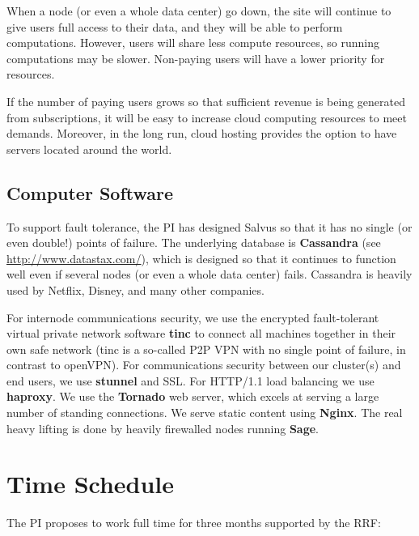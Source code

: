 \documentclass[11pt]{article}
\begin{document}
When a node (or even a whole data center) go down, the site will
continue to give users full access to their data, and they will be
able to perform computations.  However, users will share less compute
resources, so running computations may be slower.  Non-paying users
will have a lower priority for resources.

If the number of paying users grows so that sufficient revenue is
being generated from subscriptions, it will be easy to increase cloud
computing resources to meet demands.  Moreover, in the long run, cloud
hosting provides the option to have servers located around the world.

\subsection{Computer Software}

To support fault tolerance, the PI has designed Salvus so that it has
no single (or even double!) points of failure.  The underlying
database is {\bf Cassandra} (see \url{http://www.datastax.com/}),
which is designed so that it continues to function well even if
several nodes (or even a whole data center) fails.  Cassandra is
heavily used by Netflix, Disney, and many other companies.

For internode communications security, we use the encrypted
fault-tolerant virtual private network software {\bf tinc} to connect
all machines together in their own safe network (tinc is a so-called
P2P VPN with no single point of failure, in contrast to openVPN).  For
communications security between our cluster(s) and end users, we use
{\bf stunnel} and SSL.  For HTTP/1.1 load balancing we use {\bf
  haproxy}.  We use the {\bf Tornado} web server, which excels at
serving a large number of standing connections.  We serve static
content using {\bf Nginx}.  The real heavy lifting is done by heavily
firewalled nodes running {\bf Sage}.


\section{Time Schedule}

The PI proposes to work full time for three months supported by the RRF:
\end{document}
